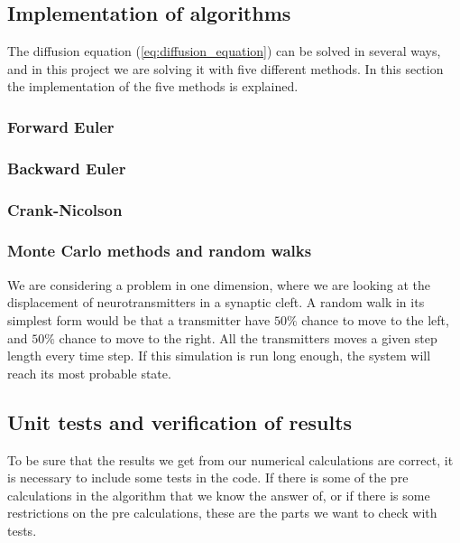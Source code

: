 \documentclass[12pt]{article}
\begin{document}
\begin{flushleft}
\subsection{Implementation of algorithms}
The diffusion equation (\ref{eq:diffusion_equation}) can be solved in several ways, and in this project we are solving it with five different methods. In this section the implementation of the five methods is explained.
\subsubsection{Forward Euler}
\subsubsection{Backward Euler}
\subsubsection{Crank-Nicolson}
\subsubsection{Monte Carlo methods and random walks}
We are considering a problem in one dimension, where we are looking at the displacement of neurotransmitters in a synaptic cleft. A random walk in its simplest form would be that a transmitter have $50\%$ chance to move to the left, and $50\%$ chance to move to the right. All the transmitters moves a given step length every time step. If this simulation is run long enough, the system will reach its most probable state. 


\subsection{Unit tests and verification of results}
To be sure that the results we get from our numerical calculations are correct, it is necessary to include some tests in the code. If there is some of the pre calculations in the algorithm that we know the answer of, or if there is some restrictions on the pre calculations, these are the parts we want to check with tests.

\end{flushleft}
\end{document}
